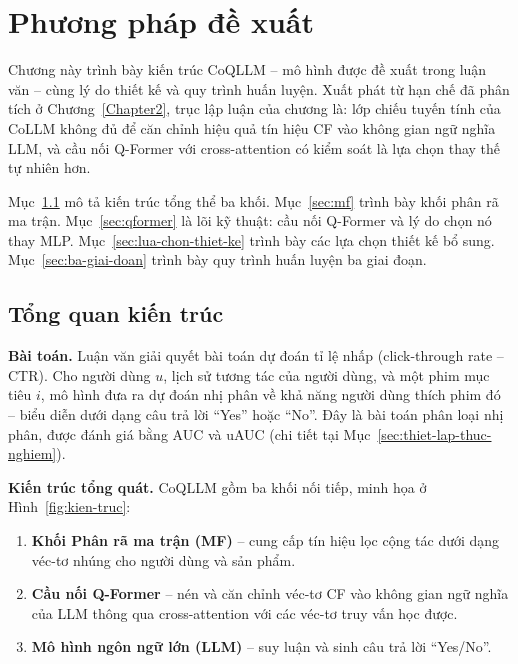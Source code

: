 \chapter{Phương pháp đề xuất}
\label{Chapter3}

Chương này trình bày kiến trúc CoQLLM -- mô hình được đề xuất trong luận văn -- cùng
lý do thiết kế và quy trình huấn luyện. Xuất phát từ hạn chế đã phân tích ở
Chương~\ref{Chapter2}, trục lập luận của chương là: lớp chiếu tuyến tính của CoLLM không
đủ để căn chỉnh hiệu quả tín hiệu CF vào không gian ngữ nghĩa LLM, và cầu nối Q-Former
với cross-attention có kiểm soát là lựa chọn thay thế tự nhiên hơn.

Mục~\ref{sec:kien-truc-tong-quan} mô tả kiến trúc tổng thể ba khối.
Mục~\ref{sec:mf} trình bày khối phân rã ma trận. Mục~\ref{sec:qformer} là lõi kỹ thuật:
cầu nối Q-Former và lý do chọn nó thay MLP. Mục~\ref{sec:lua-chon-thiet-ke} trình bày
các lựa chọn thiết kế bổ sung. Mục~\ref{sec:ba-giai-doan} trình bày quy trình huấn luyện
ba giai đoạn.

\section{Tổng quan kiến trúc}
\label{sec:kien-truc-tong-quan}

\textbf{Bài toán.} Luận văn giải quyết bài toán dự đoán tỉ lệ nhấp (click-through rate
-- CTR). Cho người dùng $u$, lịch sử tương tác của người dùng, và một phim mục tiêu $i$,
mô hình đưa ra dự đoán nhị phân về khả năng người dùng thích phim đó -- biểu diễn dưới
dạng câu trả lời ``Yes'' hoặc ``No''. Đây là bài toán phân loại nhị phân, được đánh giá
bằng AUC và uAUC (chi tiết tại Mục~\ref{sec:thiet-lap-thuc-nghiem}).

\textbf{Kiến trúc tổng quát.} CoQLLM gồm ba khối nối tiếp, minh họa ở
Hình~\ref{fig:kien-truc}:

\begin{enumerate}
    \item \textbf{Khối Phân rã ma trận (MF)} -- cung cấp tín hiệu lọc cộng tác dưới dạng
    véc-tơ nhúng cho người dùng và sản phẩm.

    \item \textbf{Cầu nối Q-Former} -- nén và căn chỉnh véc-tơ CF vào không gian ngữ nghĩa
    của LLM thông qua cross-attention với các véc-tơ truy vấn học được.

    \item \textbf{Mô hình ngôn ngữ lớn (LLM)} -- suy luận và sinh câu trả lời
    ``Yes/No''.
\end{enumerate}

